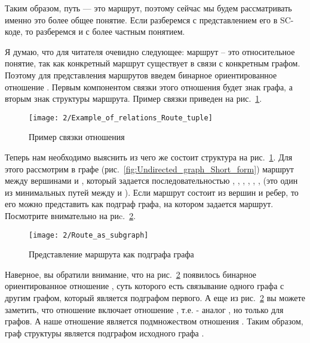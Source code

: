 Таким образом, путь — это маршрут, поэтому сейчас мы будем
рассматривать именно это более общее понятие. Если разберемся с
представлением его в SC-коде, то разберемся и с более частным
понятием.

Я думаю, что для читателя очевидно следующее: маршрут – это
относительное понятие, так как конкретный маршрут существует в связи с
конкретным графом. Поэтому для представления маршрутов введем бинарное
ориентированное отношение . Первым компонентом связки
этого отношения будет знак графа, а вторым знак структуры
маршрута. Пример связки приведен на
рис.~\ref{fig:Example_of_relations_Route_tuple}.

\begin{figure}[h]
  \centering
  \texttt{[image: 2/Example\_of\_relations\_Route\_tuple]}
  \caption{Пример связки отношения }
  \label{fig:Example_of_relations_Route_tuple}
\end{figure}

Теперь нам необходимо выяснить из чего же состоит структура 
на рис.~\ref{fig:Example_of_relations_Route_tuple}. Для этого
рассмотрим в графе 
(рис.~\ref{fig:Undirected_graph_Short_form}) маршрут  между
вершинами  и , который задается последовательностью
, , , , ,
,  (это один из минимальных путей между  и
). Если маршрут состоит из вершин и ребер, то его можно
представить как подграф графа, на котором задается маршрут. Посмотрите
внимательно на риc.~\ref{fig:Route_as_subgraph}.

\begin{figure}
  \centering
  \texttt{[image: 2/Route\_as\_subgraph]}
  \caption{Представление маршрута как подграфа графа }
  \label{fig:Route_as_subgraph}
\end{figure}

Наверное, вы обратили внимание, что на
рис.~\ref{fig:Route_as_subgraph} появилось бинарное ориентированное
отношение , суть которого есть связывание одного графа
с другим графом, который является подграфом первого. А еще из
рис.~\ref{fig:Route_as_subgraph} вы можете заметить, что отношение
 включает отношение ,
т.е.  - аналог , но только для
графов. А наше отношение  является подмножеством
отношения . Таким образом, граф структуры 
является подграфом исходного графа .

